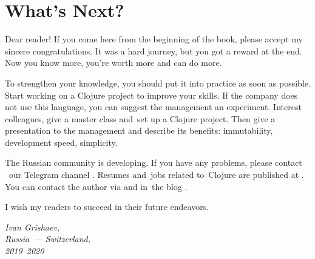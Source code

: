 \chapter{What’s Next?}

Dear reader! If you come here from the beginning of the book, please accept my sincere congratulations. 
It was a hard journey, but you got a reward at the end. 
Now you know more, you're worth more and can do more.

To strengthen your knowledge, you should put it into practice as soon as possible. 
Start working on a Clojure project to improve your skills. 
If the company does not use this language, you can suggest the management an experiment. 
Interest colleagues, give a master class and~set up a Clojure project. 
Then give a presentation to the management and describe its benefits: immutability, development speed, simplicity. 

The Russian community is developing. If you have any problems, please contact 
~our Telegram channel . 
Resumes and~jobs related to~Clojure are published at . 
You can contact the author via \emaillink\xspace and in~the blog \sitelink.

I wish my readers to succeed in their future endeavors.

\vspace{1em}

\noindent

\hspace{\fill}\parbox{4cm}{\textit{Ivan Grishaev,\\Russia~--- Switzerland,\\2019--2020}}
